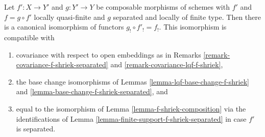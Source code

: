 %
\begin{lemma}
\label{lemma-lqf-separated-shriek-composition}
Let $f' : X \to Y'$ and $g : Y' \to Y$ be composable morphisms of schemes
with $f'$ and $f = g \circ f'$ locally quasi-finite and $g$ separated and
locally of finite type. Then there is a canonical isomorphism of functors
$g_! \circ f'_! = f_!$. This isomorphism is compatible with
\begin{enumerate}
\item[(a)] covariance with respect to open embeddings as in
Remarks \ref{remark-covariance-f-shriek-separated} and
\ref{remark-covariance-lqf-f-shriek},
\item[(b)] the base change isomorphisms of
Lemmas \ref{lemma-lqf-base-change-f-shriek}
and \ref{lemma-base-change-f-shriek-separated}, and
\item[(c)] equal to the isomorphism of Lemma \ref{lemma-f-shriek-composition}
via the identifications of Lemma \ref{lemma-finite-support-f-shriek-separated}
in case $f'$ is separated.
\end{enumerate}
\end{lemma}

